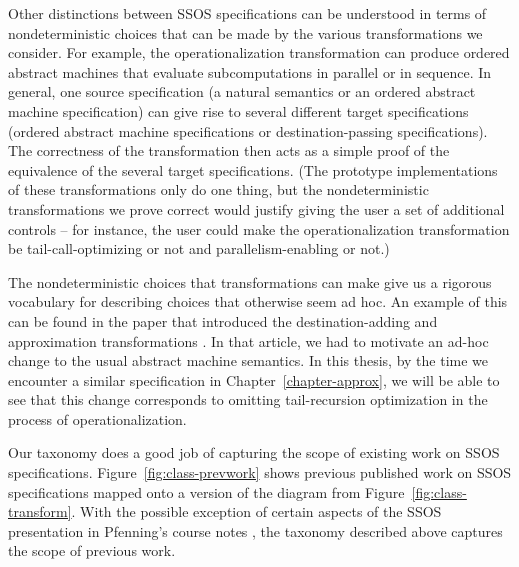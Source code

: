 Other distinctions between SSOS specifications can be understood in
terms of nondeterministic choices that can be made by the various
transformations we consider. For example, the operationalization
transformation can produce ordered abstract machines that evaluate
subcomputations in parallel or in sequence. In general, one source
specification (a natural semantics or an ordered abstract machine
specification) can give rise to several different target
specifications (ordered abstract machine specifications or
destination-passing specifications). The correctness of the
transformation then acts as a simple proof of the equivalence of the
several target specifications. (The prototype implementations of these
transformations only do one thing, but the nondeterministic
transformations we prove correct would justify giving the user a set
of additional controls -- for instance, the user could make the
operationalization transformation be tail-call-optimizing or
not and parallelism-enabling or not.)

The nondeterministic choices that transformations can make give us a
rigorous vocabulary for describing choices that otherwise seem
ad hoc. An example of this can be found in the paper that introduced
the destination-adding and approximation transformations
\cite{simmons11logical}. In that article, we had to motivate an ad-hoc
change to the usual abstract machine semantics. In this thesis, by the
time we encounter a similar specification in Chapter~\ref{chapter-approx}, 
we will be
able to see that this change corresponds to omitting tail-recursion
optimization in the process of operationalization.

Our taxonomy does a good job of capturing the scope of existing work
on SSOS specifications.  Figure~\ref{fig:class-prevwork} shows
previous published work on SSOS specifications mapped onto a version
of the diagram from Figure~\ref{fig:class-transform}.  With the
possible exception of certain aspects of the SSOS presentation in
Pfenning's course notes \cite{pfenning12substructural}, the taxonomy
described above captures the scope of previous work.


